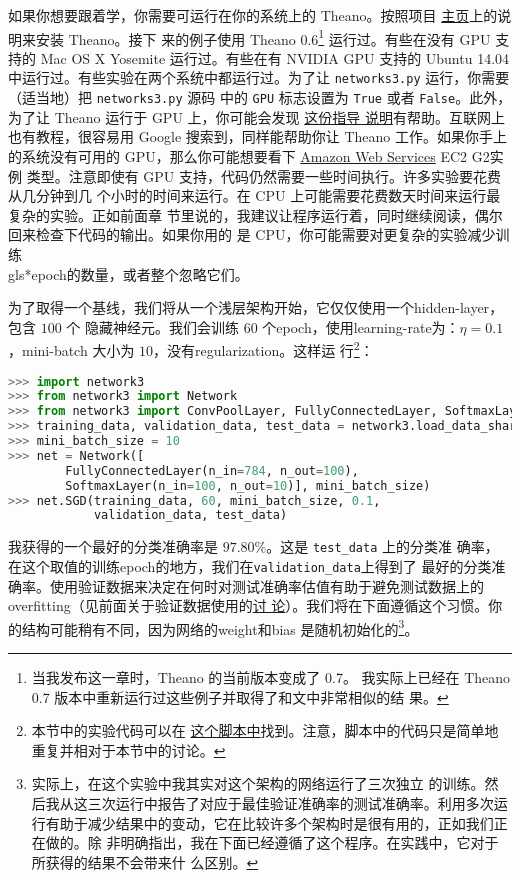 如果你想要跟着学，你需要可运行在你的系统上的 Theano。按照项目%
\href{http://deeplearning.net/software/theano/}{主页}上的说明来安装 Theano。接下
来的例子使用 Theano 0.6\footnote{当我发布这一章时，Theano 的当前版本变成了 0.7。
  我实际上已经在 Theano 0.7 版本中重新运行过这些例子并取得了和文中非常相似的结
  果。} 运行过。有些在没有 GPU 支持的 Mac OS X Yosemite 运行过。有些在有 NVIDIA
GPU 支持的 Ubuntu 14.04 中运行过。有些实验在两个系统中都运行过。为了让
\lstinline!networks3.py! 运行，你需要（适当地）把 \lstinline!networks3.py! 源码
中的 \lstinline!GPU! 标志设置为 \lstinline!True! 或者 \lstinline!False!。此外，
为了让 Theano 运行于 GPU 上，你可能会发现%
\href{http://deeplearning.net/software/theano/tutorial/using_gpu.html}{这份指导
  说明}有帮助。互联网上也有教程，很容易用 Google 搜索到，同样能帮助你让 Theano
工作。如果你手上的系统没有可用的 GPU，那么你可能想要看下
\href{http://aws.amazon.com/ec2/instance-types/}{Amazon Web Services} EC2 G2实例
类型。注意即使有 GPU 支持，代码仍然需要一些时间执行。许多实验要花费从几分钟到几
个小时的时间来运行。在 CPU 上可能需要花费数天时间来运行最复杂的实验。正如前面章
节里说的，我建议让程序运行着，同时继续阅读，偶尔回来检查下代码的输出。如果你用的
是 CPU，你可能需要对更复杂的实验减少训练\\gls*{epoch}的数量，或者整个忽略它们。

为了取得一个基线，我们将从一个浅层架构开始，它仅仅使用一个\gls*{hidden-layer}，包含 $100$ 个
隐藏神经元。我们会训练 60 个\gls*{epoch}，使用\gls*{learning-rate}为：$\eta =
0.1$，\gls*{mini-batch} 大小为 $10$，没有\gls*{regularization}。这样运
行\footnote{本节中的实验代码可以在%
  \href{https://github.com/mnielsen/neural-networks-and-deep-learning/blob/master/src/conv.py}{%
    这个脚本中}找到。注意，脚本中的代码只是简单地重复并相对于本节中的讨论。}：
\begin{lstlisting}[language=Python]
>>> import network3
>>> from network3 import Network
>>> from network3 import ConvPoolLayer, FullyConnectedLayer, SoftmaxLayer
>>> training_data, validation_data, test_data = network3.load_data_shared()
>>> mini_batch_size = 10
>>> net = Network([
        FullyConnectedLayer(n_in=784, n_out=100),
        SoftmaxLayer(n_in=100, n_out=10)], mini_batch_size)
>>> net.SGD(training_data, 60, mini_batch_size, 0.1, 
            validation_data, test_data)
\end{lstlisting}

我获得的一个最好的分类准确率是 $97.80$\%。这是 \lstinline!test_data! 上的分类准
确率，在这个取值的训练\gls*{epoch}的地方，我们在\lstinline!validation_data!上得到了
最好的分类准确率。使用验证数据来决定在何时对测试准确率估值有助于避免测试数据上的
\gls*{overfitting}（见前面关于验证数据使用的\hyperref[validation_explanation]{讨
    论}）。我们将在下面遵循这个习惯。你的结构可能稍有不同，因为网络的\gls*{weight}和\gls*{bias}
是随机初始化的\footnote{实际上，在这个实验中我其实对这个架构的网络运行了三次独立
  的训练。然后我从这三次运行中报告了对应于最佳验证准确率的测试准确率。利用多次运
  行有助于减少结果中的变动，它在比较许多个架构时是很有用的，正如我们正在做的。除
  非明确指出，我在下面已经遵循了这个程序。在实践中，它对于所获得的结果不会带来什
  么区别。}。

